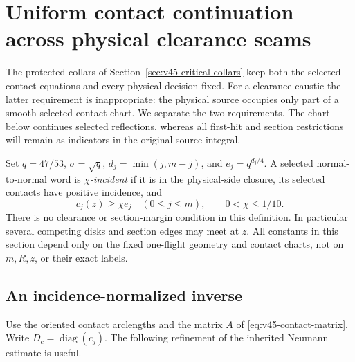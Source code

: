 \section{Uniform contact continuation across physical clearance seams}
\label{sec:v66-contact-continuation}
The protected collars of Section~\ref{sec:v45-critical-collars} keep
both the selected contact equations and every physical decision fixed.
For a clearance caustic the latter requirement is inappropriate: the
physical source occupies only part of a smooth selected-contact chart.
We separate the two requirements. The chart below continues selected
reflections, whereas all first-hit and section restrictions will remain
as indicators in the original source integral.

Set $q=47/53$, $\sigma=\sqrt q$, $d_j=\min(j,m-j)$, and
$e_j=q^{d_j/4}$. A selected normal-to-normal word is
\emph{$\chi$-incident} if it is in the physical-side closure, its
selected contacts have positive incidence, and
\begin{equation}\label{eq:v66-tapered-incidence}
 c_j(z)\ge\chi e_j\quad(0\le j\le m),\qquad 0<\chi\le1/10.
\end{equation}
There is no clearance or section-margin condition in this definition.
In particular several competing disks and section edges may meet at $z$.
All constants in this section depend only on the fixed one-flight
geometry and contact charts, not on $m,R,z$, or their exact labels.

\subsection{An incidence-normalized inverse}
Use the oriented contact arclengths and the matrix $A$ of
\eqref{eq:v45-contact-matrix}. Write $D_c=\operatorname{diag}(c_j)$.
The following refinement of the inherited Neumann estimate is useful.

